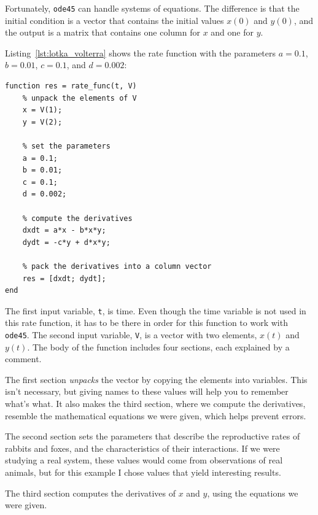 \documentclass[../../book.tex]{subfiles}
\begin{document}

Fortunately, \lstinline{ode45} can handle systems of equations.  The
difference is that the initial condition is a vector that contains the
initial values $x(0)$ and $y(0)$, and the output is a matrix
that contains one column for $x$ and one for $y$.


Listing~\ref{lst:lotka_volterra} shows the rate function
with the parameters $a = 0.1$, $b = 0.01$, $c = 0.1$, and $d = 0.002$:

\begin{lstlisting}[caption={A rate function for Lotka-Volterra}, label={lst:lotka_volterra}]
function res = rate_func(t, V)
    % unpack the elements of V
    x = V(1);
    y = V(2);

    % set the parameters
    a = 0.1;
    b = 0.01;
    c = 0.1;
    d = 0.002;

    % compute the derivatives
    dxdt = a*x - b*x*y;
    dydt = -c*y + d*x*y;

    % pack the derivatives into a column vector
    res = [dxdt; dydt];
end
\end{lstlisting}

The first input variable, \lstinline{t}, is time.
Even though the time variable is not used in this rate function,
it has to be there in order for this function to work with \lstinline{ode45}.
The second input variable, \lstinline{V}, is a vector with two elements,
$x(t)$ and $y(t)$.
The body of the function includes four sections, each explained by a comment.

The first section \emph{unpacks} the vector by copying the elements
into variables.  This isn't necessary, but giving names to
these values will help you to remember what's what.  It also makes the third
section, where we compute the derivatives, resemble the mathematical
equations we were given, which helps prevent errors.


The second section sets the parameters that describe the
reproductive rates of rabbits and foxes, and the characteristics of
their interactions.  If we were studying a real system, these values
would come from observations of real animals, but for this example
I chose values that yield interesting results.


The third section computes the derivatives of $x$ and $y$, using the equations
we were given.
\end{document}
